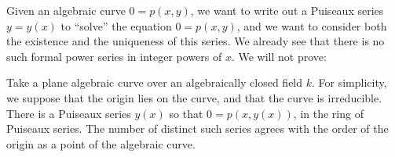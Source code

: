 Given an algebraic curve \(0=p(x,y)\), we want to write out a Puiseaux series \(y=y(x)\) to ``solve''  the equation \(0=p(x,y)\), and we want to consider both the existence and the uniqueness of this series.
We already see that there is no such formal power series in integer powers of \(x\).
We will not prove:
\begin{theorem}
Take a plane algebraic curve over an algebraically closed field \(k\).
For simplicity, we suppose that the origin lies on the curve, and that the curve is irreducible.
There is a Puiseaux series \(y(x)\) so that \(0=p(x,y(x))\), in the ring 
of Puiseaux series.
The number of distinct such series agrees with the order of the origin as a point of the algebraic curve.
\end{theorem}

